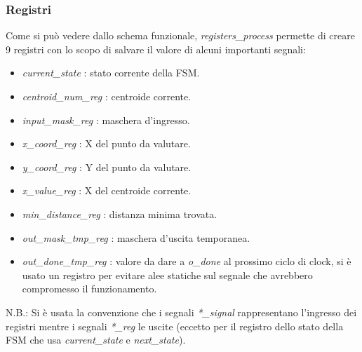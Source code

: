 \documentclass{article}
\begin{document}
\subsubsection{Registri}
Come si può vedere dallo schema funzionale, \textit{registers\_process} permette di creare 9 registri con lo scopo di salvare il valore di alcuni importanti segnali:
\begin{itemize}
    \item \textit{current\_state} : stato corrente della FSM.
    \item \textit{centroid\_num\_reg} : centroide corrente.
    \item \textit{input\_mask\_reg} : maschera d'ingresso.
    \item \textit{x\_coord\_reg} : X del punto da valutare.
    \item \textit{y\_coord\_reg} : Y del punto da valutare.
    \item \textit{x\_value\_reg} : X del centroide corrente.
    \item \textit{min\_distance\_reg} : distanza minima trovata.
    \item \textit{out\_mask\_tmp\_reg} : maschera d'uscita temporanea.
    \item \textit{out\_done\_tmp\_reg} : valore da dare a \textit{o\_done} al prossimo ciclo di clock, si è usato un registro per evitare alee statiche sul segnale che avrebbero compromesso il funzionamento.
\end{itemize}
N.B.: Si è usata la convenzione che i segnali \textit{*\_signal} rappresentano l'ingresso dei registri mentre i segnali \textit{*\_reg} le uscite (eccetto per il registro dello stato della FSM che usa \textit{current\_state} e \textit{next\_state}).
\end{document}
